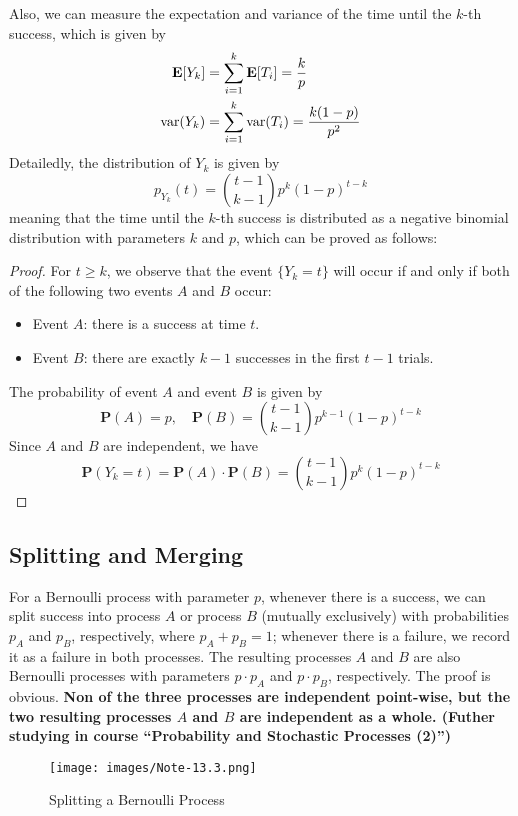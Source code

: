 Also, we can measure the expectation and variance of the time until the $k$-th success, which is given by
\begin{align}
    \mathbf{E}\qty[Y_k] &= \sum_{i=1}^{k} \mathbf{E}\qty[T_i] = \frac{k}{p} \\
    \mathrm{var}\qty(Y_k) &= \sum_{i=1}^{k} \mathrm{var}\qty(T_i) = \frac{k(1-p)}{p^2}
\end{align}
Detailedly, the distribution of $Y_k$ is given by
\begin{equation}
    p_{Y_k}(t) = \binom{t-1}{k-1} p^k (1-p)^{t-k}
\end{equation}
meaning that the time until the $k$-th success is distributed as a negative binomial distribution with parameters $k$ and $p$, which can be proved as follows:
\begin{proof}
    For $t \geq k$, we observe that the event $\{Y_k = t\}$ will occur if and only if both of the following two events $A$ and $B$ occur:
    \begin{itemize}
        \item Event $A$: there is a success at time $t$.
        \item Event $B$: there are exactly $k-1$ successes in the first $t-1$ trials.
    \end{itemize}
    The probability of event $A$ and event $B$ is given by
    \begin{equation}
        \mathbf{P}(A) = p, \quad \mathbf{P}(B) = \binom{t-1}{k-1} p^{k-1} (1-p)^{t-k}
    \end{equation}
    Since $A$ and $B$ are independent, we have
    \begin{equation}
        \mathbf{P}(Y_k = t) = \mathbf{P}(A) \cdot \mathbf{P}(B) = \binom{t-1}{k-1} p^k (1-p)^{t-k}
    \end{equation}
\end{proof}

\subsection{Splitting and Merging}
For a Bernoulli process with parameter $p$, whenever there is a success, we can split success into process $A$ or process $B$ (mutually exclusively) with probabilities $p_A$ and $p_B$, respectively, where $p_A + p_B = 1$; whenever there is a failure, we record it as a failure in both processes. The resulting processes $A$ and $B$ are also Bernoulli processes with parameters $p\cdot p_A$ and $p \cdot p_B$, respectively. The proof is obvious. \textbf{Non of the three processes are independent point-wise, but the two resulting processes $A$ and $B$ are independent as a whole. (Futher studying in course ``Probability and Stochastic Processes (2)'')}
\begin{figure}[H]
    \centering
    \texttt{[image: images/Note-13.3.png]}
    \caption{Splitting a Bernoulli Process}
\end{figure}

